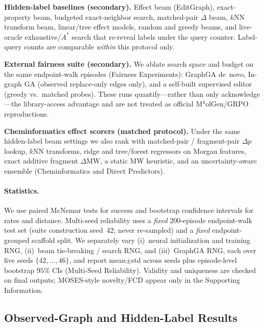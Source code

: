 \textbf{Hidden-label baselines (secondary).} Effect beam (EditGraph), exact-property beam, budgeted exact-neighbor search, matched-pair $\Delta$ beam, $k$NN transform beam, linear/tree effect models, random and greedy beams, and live-oracle exhaustive/$A^\ast$ search that re-reveal labels under the query counter. Label-query counts are comparable \emph{within} this protocol only.

\textbf{External fairness suite (secondary).} We ablate search space and budget on the same endpoint-walk episodes (Fairness Experiments): GraphGA de~novo, In-graph GA (observed replace-only edges only), and a self-built supervised editor (greedy vs.\ matched probes). These runs quantify---rather than only acknowledge---the library-access advantage and are not treated as official M$^4$olGen/GRPO reproductions.

\textbf{Cheminformatics effect scorers (matched protocol).} Under the same hidden-label beam settings we also rank with matched-pair / fragment-pair $\Delta p$ lookup, $k$NN transforms, ridge and tree/forest regressors on Morgan features, exact additive fragment $\Delta\mathrm{MW}$, a static MW heuristic, and an uncertainty-aware ensemble (Cheminformatics and Direct Predictors).

\paragraph{Statistics.}
We use paired McNemar tests for success and bootstrap confidence intervals for rates and distance. Multi-seed reliability uses a \emph{fixed} 200-episode endpoint-walk test set (suite construction seed~42; never re-sampled) and a \emph{fixed} endpoint-grouped scaffold split. We separately vary (i)~neural initialization and training RNG, (ii)~beam tie-breaking / search RNG, and (iii)~GraphGA RNG, each over five seeds $\{42,\ldots,46\}$, and report mean$\pm$std across seeds plus episode-level bootstrap $95\%$ CIs (Multi-Seed Reliability). Validity and uniqueness are checked on final outputs; MOSES-style novelty/FCD appear only in the Supporting Information.

\subsection{Observed-Graph and Hidden-Label Results}

